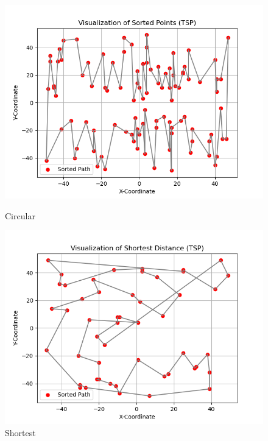 \documentclass[11pt,openany]{book}
\begin{document}
\begin{figure}[H]
      \centering
      \begin{minipage}{.48\textwidth}
            \centering
            \includegraphics[width=1.1\linewidth]{assets/Img/CircVisual.png}
            \caption{Circular}
            \label{fig:nearest}
      \end{minipage}%
      \begin{minipage}{.48\textwidth}
            \centering
            \includegraphics[width=1.1\linewidth]{assets/Img/ShortestVisual.png}
            \caption{Shortest}
            \label{fig:ordered}
      \end{minipage}
\end{figure}
\end{document}

